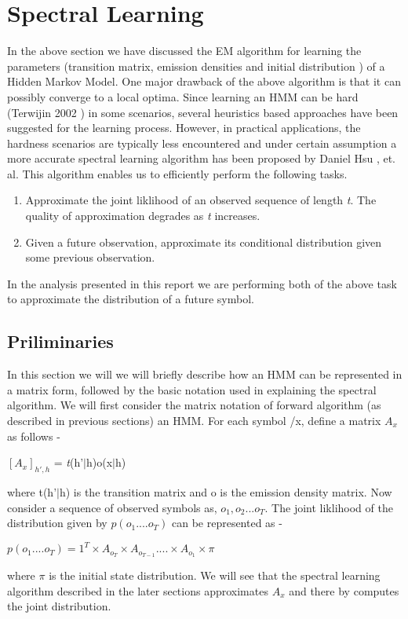 \documentclass{article} %
\begin{document}
\section{Spectral Learning}
\label{Spectral Learning}

In the above section we have discussed the EM algorithm for learning the parameters (transition matrix, emission densities and initial distribution ) of a Hidden Markov Model. One major drawback of the above algorithm is that it can possibly converge to a local optima. Since learning an HMM can be hard (Terwijin 2002 ) in some scenarios, several heuristics based approaches have been suggested for the learning process. However, in practical applications, the hardness scenarios are typically less encountered and under certain assumption a more accurate spectral learning algorithm has been proposed by Daniel Hsu , et. al.  This algorithm enables us to efficiently perform the following tasks.
\begin{enumerate}
	\item Approximate the joint liklihood of an observed sequence of length \textit{t}. The quality of approximation degrades as \textit{t} increases.
	\item Given a future observation, approximate its conditional distribution given some previous observation. 
\end{enumerate}
In the analysis presented in this report we are performing both of the above task to approximate the distribution of a future symbol.
\subsection{Priliminaries}
In this section we will we will briefly describe how an HMM can be represented in a matrix form, followed by the basic notation used in explaining the spectral algorithm. 
\newline
We will first consider the matrix notation of forward algorithm (as described in previous sections) an HMM. For each symbol /x, define a matrix $A_x$ as follows -
\begin{center}
$[A_x]_{h',h}$ = \textit{t}(h'$\vert$h)o(x$\vert$h) 

\end{center}
 
where t(h'$\vert$h) is the transition matrix and o is the emission density matrix.
Now consider a sequence of observed symbols as, $o_1,o_2...o_T$. The joint liklihood of the distribution given by $p(o_1....o_T)$ can be represented as -
\begin{center}
$p(o_1....o_T) = 1^T \times A_{o_T} \times A_{o_{T-1}} . . . . \times A_{o_1} \times \pi$
\end{center}
where $\pi$ is the initial state distribution. We will see that the spectral learning algorithm described in the later sections approximates $A_x$ and there by computes the joint distribution.
\end{document}
